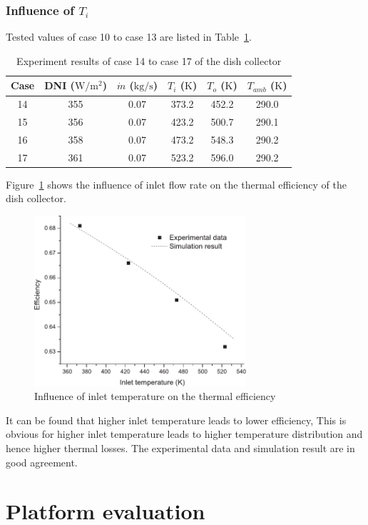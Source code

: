 \subsubsection{Influence of $T_i$}

Tested values of case 10 to case 13 are listed in Table~\ref{tab:ResultOfDish3}.

\begin{table}[htbp]\footnotesize
	\caption{Experiment results of case 14 to case 17 of the dish collector}
	\begin{center}
	\begin{tabular}{cccccc}
		\toprule
		Case	& DNI ($\mathrm{W/m^2}$)	&	$\dot{m}$ ($\mathrm{kg/s}$)			&	$T_i$ ($\mathrm{K}$)	&	$T_o$ ($\mathrm{K}$)		&	$T_{amb}$ ($\mathrm{K}$)\\
		\midrule
		14	&	355	&	0.07	&	373.2	&	452.2	&	290.0\\
		15	&	356	&	0.07	&	423.2	&	500.7	&	290.1\\
		16	&	358	&	0.07	&	473.2	&	548.3	&	290.2	\\
		17	&	361	&	0.07	&	523.2	&	596.0	&	290.2\\
		\bottomrule
	\end{tabular}
	\end{center}
	\label{tab:ResultOfDish3}
\end{table}

Figure~\ref{fig:T_i-eta} shows the influence of inlet flow rate on the thermal efficiency of the dish collector.
\begin{figure}[!ht]
\centering
\includegraphics[width=0.7\textwidth]{fig/T_i-eta}
\caption{Influence of inlet temperature on the thermal efficiency}
\label{fig:T_i-eta}
\end{figure}

It can be found that higher inlet temperature leads to lower efficiency, This is obvious for higher inlet temperature leads to higher temperature distribution and hence higher thermal losses. The experimental data and simulation result are in good agreement.

\section{Platform evaluation}